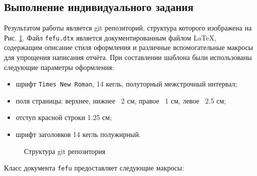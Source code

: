 \documentclass[../document.tex]{subfiles}
\begin{document}
    \subsection{Выполнение индивидуального задания}
    \par Результатом работы является git репозиторий\cite{git_repo}, структура которого изображена на Рис. \ref{repo_dir}. Файл \texttt{fefu.dtx} является документированным файлом LaTeX, содержащим описание стиля оформления и различные вспомогательные макросы для упрощения написания отчёта. При составлении шаблона были использованы следующие параметры оформления:
    \begin{itemize}
        \item шрифт \texttt{Times New Roman}, 14 кегль, полуторный межстрочный интервал;
        \item поля страницы: верхнее, нижнее \textemdash\ 2 см, правое \textemdash\ 1 см, левое \textemdash\ 2.5 см;
        \item отступ красной строки 1.25 см;
        \item шрифт заголовков 14 кегль полужирный.
    \end{itemize}
    \begin{figure}[H]
        \caption{\label{repo_dir}Структура git репозитория}
    \end{figure}
    \par Класс документа \texttt{fefu} предоставляет следующие макросы:
\end{document}
